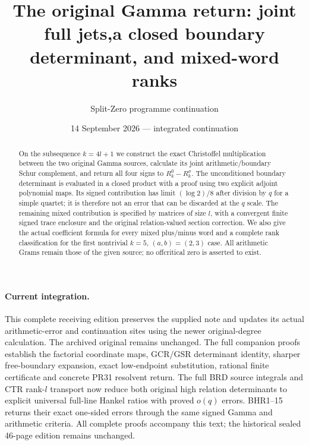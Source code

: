 \documentclass[11pt,a4paper]{article}
\title{The original Gamma return: joint full jets,\newline a closed boundary determinant, and mixed-word ranks}
\author{Split-Zero programme continuation}
\date{14 September 2026 --- integrated continuation}
\begin{document}
\maketitle
\begin{abstract}
On the subsequence $k=4l+1$ we construct the exact Christoffel multiplication between the two original Gamma sources, calculate its joint arithmetic/boundary Schur complement, and return all four signs to $R_k^0-R_k^\sigma$. The unconditioned boundary determinant is evaluated in a closed product with a proof using two explicit adjoint polynomial maps. Its signed contribution has limit $(\log 2)/8$ after division by $q$ for a simple quartet; it is therefore not an error that can be discarded at the $q$ scale. The remaining mixed contribution is specified by matrices of size $l$, with a convergent finite signed trace enclosure and the original relation-valued section correction. We also give the actual coefficient formula for every mixed plus/minus word and a complete rank classification for the first nontrivial $k=5$, $(a,b)=(2,3)$ case. All arithmetic Grams remain those of the given source; no offcritical zero is asserted to exist.
\end{abstract}
\paragraph{Current integration.}
This complete receiving edition preserves the supplied note and updates
its actual arithmetic-error and continuation sites using the newer
original-degree calculation. The archived original remains unchanged.
The full companion proofs establish the factorial coordinate maps,
GCR/GSR determinant identity, sharper free-boundary expansion,
exact low-endpoint substitution, rational finite certificate and
concrete PR31 resolvent return. The full BRD source integrals
and CTR rank-$l$ transport now reduce both original high relation
determinants to explicit universal full-line Hankel ratios with
proved $o(q)$ errors. BHR1--15 returns their exact one-sided
errors through the same signed Gamma and arithmetic criteria.
All complete proofs accompany this text; the historical sealed
46-page edition remains unchanged.
\tableofcontents
\end{document}
